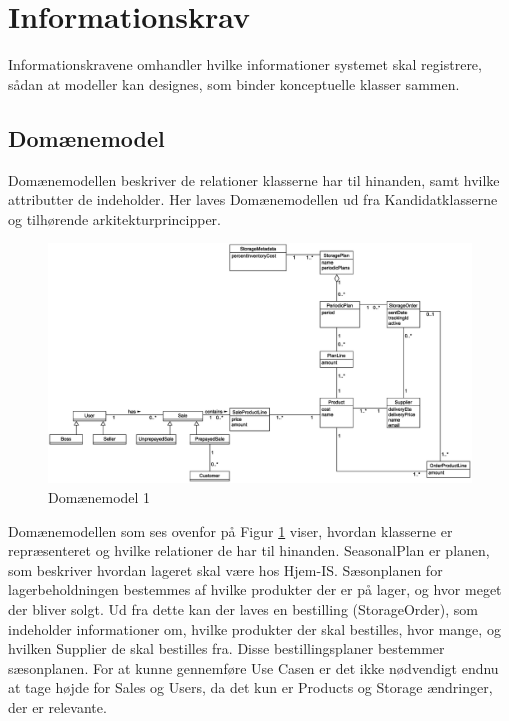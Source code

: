 \section{Informationskrav}\label{sec:informations-krav}
Informationskravene omhandler hvilke informationer systemet skal registrere, sådan at modeller 
kan designes, som binder konceptuelle klasser sammen.

\subsection{Domænemodel}\label{Domainmodel}
Domænemodellen \cite{Larman2004} beskriver de relationer klasserne har til hinanden, samt hvilke attributter de indeholder. Her laves Domænemodellen ud fra Kandidatklasserne og tilhørende arkitekturprincipper.

\begin{landscape}
\begin{figure}[p]
    \centering
    \includegraphics[width=0.9\hsize]{figures/krav/domain_model_1.eps}
    \caption{Domænemodel 1}
    \label{fig:domain_model}
\end{figure}
\end{landscape}

Domænemodellen som ses ovenfor på Figur \ref{fig:domain_model} viser, hvordan klasserne er repræsenteret og hvilke relationer de har til hinanden. SeasonalPlan er planen, som beskriver hvordan lageret skal være hos Hjem-IS. Sæsonplanen for lagerbeholdningen bestemmes af hvilke produkter der er på lager, og hvor meget der bliver solgt. Ud fra dette kan der laves en bestilling (StorageOrder), som indeholder informationer om, hvilke produkter der skal bestilles, hvor mange, og hvilken Supplier de skal bestilles fra. Disse bestillingsplaner bestemmer sæsonplanen.
For at kunne gennemføre Use Casen er det ikke nødvendigt endnu at tage højde for Sales og Users, da det kun er Products og Storage ændringer, der er relevante. 

